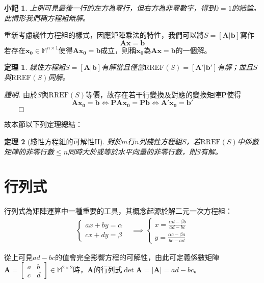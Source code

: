 \documentclass[12pt]{article}
\newcommand{\rref}{\mathrm{RREF}}
\newtheorem*{theorem}{定理}
\newtheorem*{remark}{小記}
\renewenvironment*{proof}{\textit{證明.}}{\hfill$\qed$}
\begin{document}
    \begin{remark}
        上例可見最後一行的左方為零行，但右方為非零數字，得到$0=1$的結論。此情形我們稱方程組無解。
    \end{remark}

    重新考慮綫性方程組的樣式，因應矩陣乘法的特性，我們可以將$S=[\mathbf{A}|\mathbf{b}]$寫作$$\mathbf{A}\mathbf{x}=\mathbf{b}$$若存在$\mathbf{x_0}\in\mathbb{M}^{n\times 1}$使得$\mathbf{Ax_0}=\mathbf{b}$成立，則稱$\mathbf{x_0}$為$\mathbf{A}\mathbf{x}=\mathbf{b}$的一個解。

    \begin{theorem}
        綫性方程組$S=[\mathbf{A}|\mathbf{b}]$有解當且僅當$\rref(S)=[\mathbf{A}'|\mathbf{b}']$有解；並且$S$與$\rref(S)$同解。
    \end{theorem}

    \begin{proof}
        由於$S$與$\rref(S)$等價，故存在若干行變換及對應的變換矩陣$\mathbf{P}$使得$$\mathbf{Ax_0}=\mathbf{b}\iff \mathbf{PAx_0}=\mathbf{Pb}\iff \mathbf{A'x_0}=\mathbf{b'}$$
    \end{proof}

    故本節以下列定理總結：

    \begin{theorem}[綫性方程組的可解性II]
        對於$m$行$n$列綫性方程組$S$，若$\rref(S)$中係數矩陣的非零行數$\leq n$同時大於或等於水平向量的非零行數，則$S$有解。
    \end{theorem}
    \newpage

    \section*{行列式}

    行列式為矩陣運算中一種重要的工具，其概念起源於解二元一次方程組：\begin{align*}
        \begin{cases}
            ax+by=\alpha\\cx+dy=\beta
        \end{cases}&\implies\begin{cases}
            x=\frac{\alpha d-\beta b}{ad-bc}\\y=\frac{\alpha c-\beta a}{bc-ad}
        \end{cases}
    \end{align*}

    從上可見$ad-bc$的值會完全影響方程的可解性，由此可定義係數矩陣$\mathbf{A}=\begin{bmatrix}
        a&b\\c&d
    \end{bmatrix}\in\mathbb{M}^{2\times 2}$時，$\mathbf{A}$的行列式$\det\mathbf{A}=|\mathbf{A}|=ad-bc$。
\end{document}
